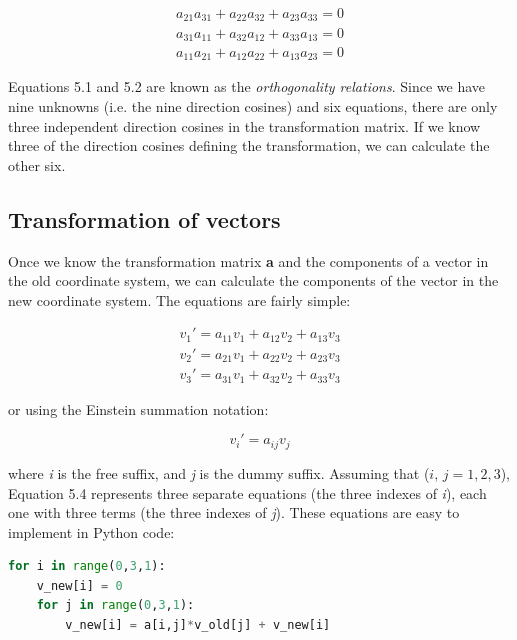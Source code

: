 \documentclass[a4paper , 12pt]{book}
\begin{document}
\begin{equation}
    \begin{split}
        a_{21}a_{31}+a_{22}a_{32}+a_{23}a_{33}=0 \\
        a_{31}a_{11}+a_{32}a_{12}+a_{33}a_{13}=0 \\
        a_{11}a_{21}+a_{12}a_{22}+a_{13}a_{23}=0
    \end{split}
\end{equation}

Equations 5.1 and 5.2 are known as the \textit{orthogonality relations}. Since we have nine unknowns (i.e. the nine direction cosines) and six equations, there are only three independent direction cosines in the transformation matrix. If we know three of the direction cosines defining the transformation, we can calculate the other six.

\subsection{Transformation of vectors}

Once we know the transformation matrix \textbf{a} and the components of a vector in the old coordinate system, we can calculate the components of the vector in the new coordinate system. The equations are fairly simple:

\begin{equation}
    \begin{split}
        v_1\text{$'$}=a_{11}v_1+a_{12}v_2+a_{13}v_3 \\
        v_2\text{$'$}=a_{21}v_1+a_{22}v_2+a_{23}v_3 \\
        v_3\text{$'$}=a_{31}v_1+a_{32}v_2+a_{33}v_3
    \end{split}
\end{equation}

or using the Einstein summation notation:

\begin{equation}
    v_i\text{$'$}=a_{ij}v_j
\end{equation}

where \textit{i} is the free suffix, and \textit{j} is the dummy suffix. Assuming that ($i,\,j=1,2,3$), Equation 5.4 represents three separate equations (the three indexes of \textit{i}), each one with three terms (the three indexes of \textit{j}). These equations are easy to implement in Python code:

\begin{center}
\begin{lstlisting}[language=Python, frame=single]
for i in range(0,3,1):
    v_new[i] = 0
    for j in range(0,3,1):
        v_new[i] = a[i,j]*v_old[j] + v_new[i]
\end{lstlisting}
\end{center}
\end{document}
